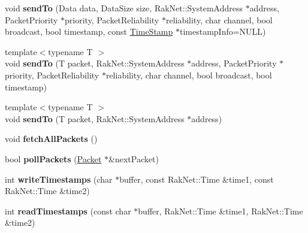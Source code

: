 \begin{DoxyCompactItemize}
\item 
\hypertarget{class_champ_net_1_1_network_a1490e576ec8bf76357c56b16658a1aa1}{void {\bfseries send\-To} (Data data, Data\-Size size, Rak\-Net\-::\-System\-Address $\ast$address, Packet\-Priority $\ast$priority, Packet\-Reliability $\ast$reliability, char channel, bool broadcast, bool timestamp, const \hyperlink{struct_champ_net_1_1_time_stamp}{Time\-Stamp} $\ast$timestamp\-Info=N\-U\-L\-L)}\label{class_champ_net_1_1_network_a1490e576ec8bf76357c56b16658a1aa1}

\item 
\hypertarget{class_champ_net_1_1_network_ad24d4552c6b597b5667965c323221aaa}{{\footnotesize template$<$typename T $>$ }\\void {\bfseries send\-To} (T packet, Rak\-Net\-::\-System\-Address $\ast$address, Packet\-Priority $\ast$priority, Packet\-Reliability $\ast$reliability, char channel, bool broadcast, bool timestamp)}\label{class_champ_net_1_1_network_ad24d4552c6b597b5667965c323221aaa}

\item 
\hypertarget{class_champ_net_1_1_network_abcd324ec71ef70454b7e4476f070c932}{{\footnotesize template$<$typename T $>$ }\\void {\bfseries send\-To} (T packet, Rak\-Net\-::\-System\-Address $\ast$address)}\label{class_champ_net_1_1_network_abcd324ec71ef70454b7e4476f070c932}

\item 
\hypertarget{class_champ_net_1_1_network_a981aef84fbe239079ea158931e5eeb71}{void {\bfseries fetch\-All\-Packets} ()}\label{class_champ_net_1_1_network_a981aef84fbe239079ea158931e5eeb71}

\item 
\hypertarget{class_champ_net_1_1_network_ae01cddc2981169cda9f4d65661c204f6}{bool {\bfseries poll\-Packets} (\hyperlink{class_champ_net_1_1_packet}{Packet} $\ast$\&next\-Packet)}\label{class_champ_net_1_1_network_ae01cddc2981169cda9f4d65661c204f6}

\item 
\hypertarget{class_champ_net_1_1_network_af31e6a74b5354057bd01c95670e3c7a3}{int {\bfseries write\-Timestamps} (char $\ast$buffer, const Rak\-Net\-::\-Time \&time1, const Rak\-Net\-::\-Time \&time2)}\label{class_champ_net_1_1_network_af31e6a74b5354057bd01c95670e3c7a3}

\item 
\hypertarget{class_champ_net_1_1_network_ae298bf9276a935974c0b69bc5011f8dc}{int {\bfseries read\-Timestamps} (const char $\ast$buffer, Rak\-Net\-::\-Time \&time1, Rak\-Net\-::\-Time \&time2)}\label{class_champ_net_1_1_network_ae298bf9276a935974c0b69bc5011f8dc}

\end{DoxyCompactItemize}
